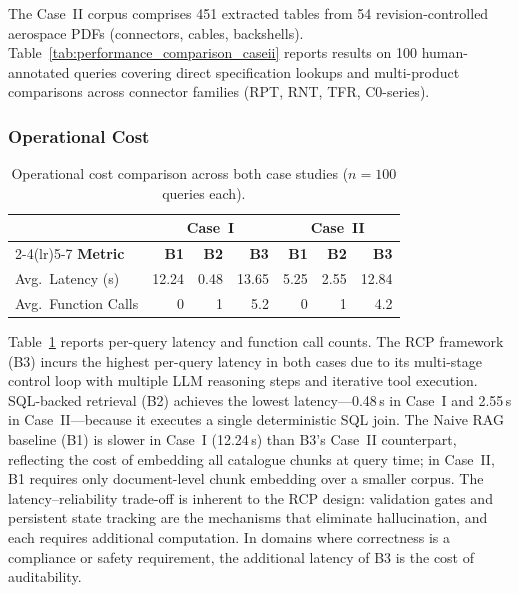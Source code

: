 \documentclass[largeformat]{interact}
\begin{document}
The Case~II corpus comprises 451 extracted tables from 54 revision-controlled aerospace PDFs (connectors, cables, backshells). Table~\ref{tab:performance_comparison_caseii} reports results on 100 human-annotated queries covering direct specification lookups and multi-product comparisons across connector families (RPT, RNT, TFR, C0-series).


\subsubsection{Operational Cost}
\label{subsubsec:operational_cost}

\begin{table}[h]
    \centering
    \caption{Operational cost comparison across both case studies ($n = 100$ queries each).}
    \label{tab:operational_cost_combined}
    \small
    \setlength{\tabcolsep}{5pt}
    \renewcommand{\arraystretch}{1.1}
    \begin{tabular}{@{}lrrrrrr@{}}
        \toprule
        & \multicolumn{3}{c}{\textbf{Case~I}} & \multicolumn{3}{c}{\textbf{Case~II}} \\
        \cmidrule(lr){2-4}\cmidrule(lr){5-7}
        \textbf{Metric} & \textbf{B1} & \textbf{B2} & \textbf{B3} & \textbf{B1} & \textbf{B2} & \textbf{B3} \\
        \midrule
        Avg.\ Latency (s)    & 12.24 & 0.48  & 13.65 & 5.25  & 2.55  & 12.84 \\
        Avg.\ Function Calls & 0     & 1     & 5.2   & 0     & 1     & 4.2   \\
        \bottomrule
    \end{tabular}
\end{table}

Table~\ref{tab:operational_cost_combined} reports per-query latency and function call counts. The RCP framework (B3) incurs the highest per-query latency in both cases due to its multi-stage control loop with multiple LLM reasoning steps and iterative tool execution. SQL-backed retrieval (B2) achieves the lowest latency---0.48\,s in Case~I and 2.55\,s in Case~II---because it executes a single deterministic SQL join. The Naive RAG baseline (B1) is slower in Case~I (12.24\,s) than B3's Case~II counterpart, reflecting the cost of embedding all catalogue chunks at query time; in Case~II, B1 requires only document-level chunk embedding over a smaller corpus. The latency--reliability trade-off is inherent to the RCP design: validation gates and persistent state tracking are the mechanisms that eliminate hallucination, and each requires additional computation. In domains where correctness is a compliance or safety requirement, the additional latency of B3 is the cost of auditability.
\end{document}

